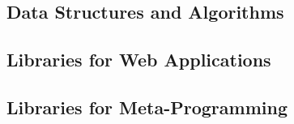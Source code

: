 {\subsection{Data Structures and Algorithms}












\subsection{Libraries for Web Applications}













\subsection{Libraries for Meta-Programming}

















} %


